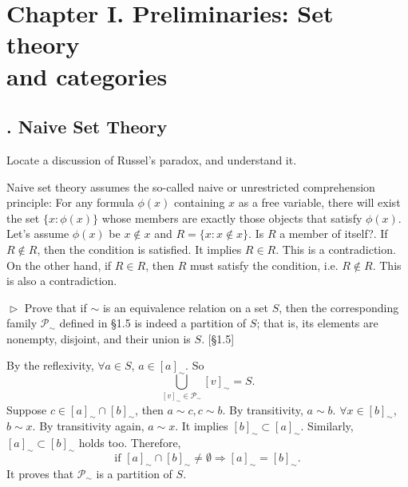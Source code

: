 \section{Chapter I.\hspace{0.2em} Preliminaries: Set theory \\ and categories}

\subsection{. Naive Set Theory}

\begin{problem}[1.1]
	Locate a discussion of Russel's paradox, and understand it.
\end{problem}

\begin{solution}
Naive set theory assumes the so-called naive or unrestricted comprehension principle: For any formula 
$\phi(x)$ containing $x$ as a free variable, there will exist the set $\{x: \phi(x)\}$ whose members are
exactly those objects that satisfy $\phi(x)$. Let's assume $\phi(x)$ be $x\notin x$ and 
$R = \{x: x\notin x\}$. Is $R$ a member of itself?. If $R\notin R$, 
then the condition is satisfied. It implies $R\in R$. This is a contradiction. On the other hand, if $R\in R$,
then $R$ must satisfy the condition, i.e. $R\notin R$. This is also a contradiction.
\end{solution}

\hypertarget{Exercise I.1.2}{}
\begin{problem}[1.2]
	$\vartriangleright$ Prove that if $\sim$ is an equivalence relation on a set $S$, then
	the corresponding family $\mathscr{P}_{\sim}$ defined in \S1.5 is indeed a
	partition of $S$; that is, its elements are nonempty, disjoint, and their union
	is $S$. [\S1.5]
\end{problem}

\begin{solution}
By the reflexivity, $\forall a\in S$, $a\in [a]_{\sim}$. So $$\bigcup_{[v]_{\sim}\in \mathscr{P}_{\sim}}[v]_{\sim} = S.$$
Suppose $c\in [a]_{\sim}\cap[b]_{\sim}$, then $a \sim c, c\sim b$. By transitivity, $a\sim b$.
$\forall x\in [b]_{\sim}$, $b\sim x$. By transitivity again, $a\sim x$. It implies $[b]_{\sim}\subset[a]_{\sim}$. Similarly,
$[a]_{\sim}\subset[b]_{\sim}$ holds too. Therefore, 
$$\text{if } [a]_{\sim} \cap [b]_{\sim}\neq \emptyset \Rightarrow [a]_{\sim} = [b]_{\sim}.$$
It proves that $\mathscr{P}_{\sim}$ is a partition of $S$.
\end{solution}

